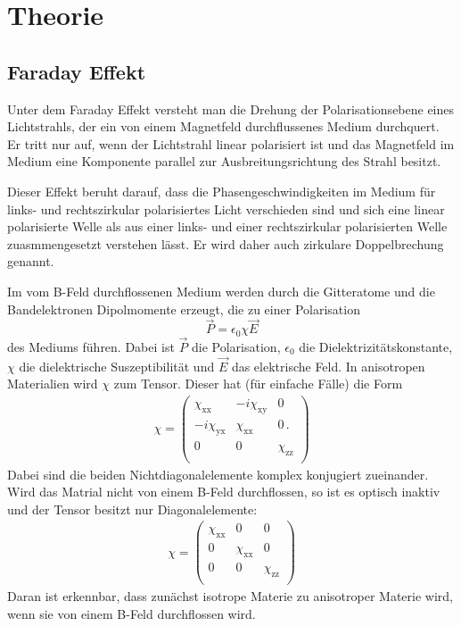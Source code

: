 \section{Theorie}
\label{sec:Theorie}

\subsection{Faraday Effekt}
\label{subsec:faraday}
Unter dem Faraday Effekt versteht man die Drehung der Polarisationsebene eines
Lichtstrahls, der ein von einem Magnetfeld durchflussenes Medium durchquert.
Er tritt nur auf, wenn der Lichtstrahl linear polarisiert ist und das Magnetfeld
im Medium eine Komponente parallel zur Ausbreitungsrichtung des Strahl besitzt.

Dieser Effekt beruht darauf, dass die Phasengeschwindigkeiten im Medium für links- und
rechtszirkular polarisiertes Licht verschieden sind und sich eine linear polarisierte
Welle als aus einer links- und einer rechtszirkular polarisierten Welle zuasmmengesetzt
verstehen lässt. Er wird daher auch zirkulare Doppelbrechung genannt.

Im vom B-Feld durchflossenen Medium werden durch die Gitteratome und die Bandelektronen
Dipolmomente erzeugt, die zu einer Polarisation
\begin{equation}
  \vec{P} = \epsilon_0 \chi \vec{E}
  \label{eqn:polarisation}
\end{equation}
des Mediums führen. Dabei ist $\vec{P}$ die Polarisation, $\epsilon_0$ die
Dielektrizitätskonstante, $\chi$ die dielektrische Suszeptibilität und
$\vec{E}$ das elektrische Feld. In anisotropen Materialien wird $\chi$ zum Tensor.
Dieser hat (für einfache Fälle) die Form
\begin{align}
  \chi =
  \left( \begin{matrix}
         \chi_{\mathrm{xx}} & -i \chi_{\mathrm{xy}} & 0 \\
         -i \chi_{\mathrm{yx}} & \chi_{\mathrm{xx}} & 0 \,.\\
         0 & 0 & \chi_{\mathrm{zz}}  \\
  \end{matrix} \right)
  \label{eqn:chitensor}
\end{align}
Dabei sind die beiden Nichtdiagonalelemente komplex konjugiert zueinander. Wird das
Matrial nicht von einem B-Feld durchflossen, so ist es optisch inaktiv und der
Tensor besitzt nur Diagonalelemente:
\begin{align}
  \chi =
  \left( \begin{matrix}
         \chi_{\mathrm{xx}} & 0 & 0 \\
         0 & \chi_{\mathrm{xx}} & 0 \\
         0 & 0 & \chi_{\mathrm{zz}}  \\
  \end{matrix} \right)
  \label{eqn:chitensor2}
\end{align}
Daran ist erkennbar, dass zunächst isotrope Materie zu anisotroper Materie wird,
wenn sie von einem B-Feld durchflossen wird.

